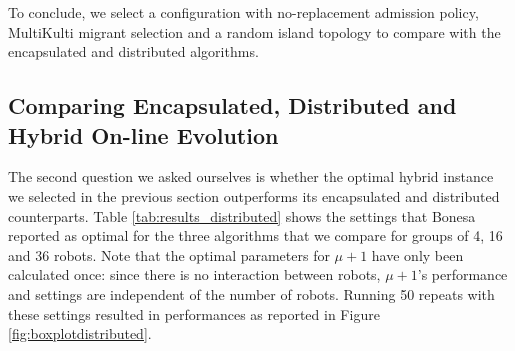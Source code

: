 \documentclass[runningheads]{llncs}
\begin{document}
To conclude, we select a configuration with no-replacement admission policy, MultiKulti migrant selection and a random island topology to compare with the encapsulated and distributed algorithms.

\subsection{Comparing Encapsulated, Distributed and Hybrid On-line Evolution}

The second question we asked ourselves is whether the optimal hybrid instance we selected in the previous section outperforms its encapsulated and distributed counterparts.
Table \ref{tab:results_distributed} shows the settings that Bonesa reported as optimal for the three algorithms that we compare for groups of 4, 16 and 36 robots. Note that the optimal parameters for $\mu+1$ have only been calculated once: since there is no interaction between robots, $\mu+1$'s performance and settings are independent of the number of robots.
Running 50 repeats with these settings resulted in performances as reported in Figure \ref{fig:boxplotdistributed}.
\end{document}
